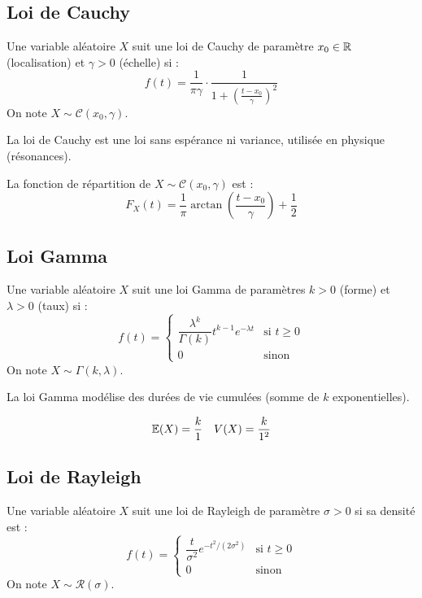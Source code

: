 \subsection{Loi de Cauchy}

\begin{definition}
    Une variable aléatoire $X$ suit une loi de Cauchy de paramètre $x_0 \in \mathbb{R}$ (localisation) et $\gamma > 0$ (échelle) si :
        \[ f(t) = \frac{1}{\pi \gamma} \cdot \frac{1}{1 + \left( \frac{t - x_0}{\gamma} \right)^2} \]
    On note $X \sim \mathcal{C}(x_0, \gamma)$.
\end{definition}

La loi de Cauchy est une loi sans espérance ni variance, utilisée en physique (résonances).

\begin{proposition}
    La fonction de répartition de $X \sim \mathcal{C}(x_0, \gamma)$ est :
        \[ F_X(t) = \frac{1}{\pi} \arctan\left( \frac{t - x_0}{\gamma} \right) + \frac{1}{2} \]
\end{proposition}


\subsection{Loi Gamma}

\begin{definition}
    Une variable aléatoire $X$ suit une loi Gamma de paramètres $k > 0$ (forme) et $\lambda > 0$ (taux) si :
        \[ f(t) = 
            \begin{cases}
                \dfrac{\lambda^k}{\Gamma(k)} t^{k-1} e^{-\lambda t} & \text{si } t \geq 0 \\
                0 & \text{sinon}
            \end{cases} \]
    On note $X \sim \Gamma(k, \lambda)$.
\end{definition}

La loi Gamma modélise des durées de vie cumulées (somme de $k$ exponentielles).

\begin{proposition}
    \[ \mathbb{E}(X) = \frac{k}{1} \quad V(X) = \frac{k}{1^2} \]
\end{proposition}


\subsection{Loi de Rayleigh}

\begin{definition}
    Une variable aléatoire $X$ suit une loi de Rayleigh de paramètre $\sigma > 0$ si sa densité est :
        \[ f(t) = 
            \begin{cases}
                \dfrac{t}{\sigma^2} e^{-t^2 / (2 \sigma^2)} & \text{si } t \geq 0 \\
                0 & \text{sinon}
            \end{cases} \]
    On note $X \sim \mathcal{R}(\sigma)$.
\end{definition}

